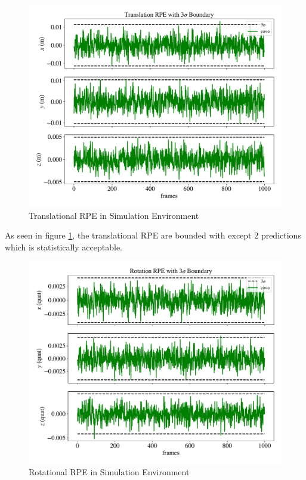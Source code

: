 \documentclass[a4paper]{report}
\numberwithin{figure}{section}
\begin{document}
\begin{figure}[H]
  \centering
  \includegraphics[width=0.8\linewidth,natwidth=640,natheight=640]
  {fig/eva_graphs/synt_trans_rpe_3sigma.pdf}
  \caption{Translational RPE in Simulation Environment}
  \label{fig:synt_trans_rpe_3sigma}
\end{figure}

As seen in figure \ref{fig:synt_trans_rpe_3sigma}, the translational RPE 
are bounded with except 2 predictions which is statistically 
acceptable. 

\begin{figure}[H]
  \centering
  \includegraphics[width=0.8\linewidth,natwidth=640,natheight=640]
  {fig/eva_graphs/synt_rot_rpe_3sigma.pdf}
  \caption{Rotational RPE in Simulation Environment}
	\label{fig:synt_rot_rpe_3sigma}
\end{figure}
\end{document}
